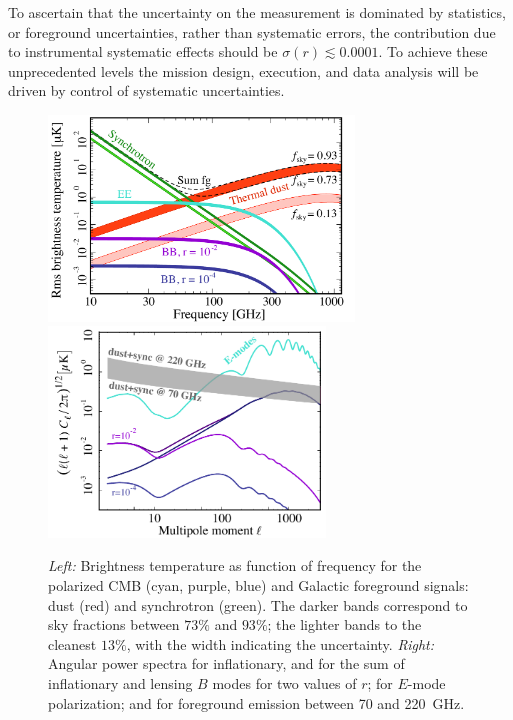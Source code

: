 To ascertain that the uncertainty on the measurement is dominated by statistics, or foreground 
uncertainties, rather than systematic errors, the contribution due to instrumental systematic effects 
should be $\sigma(r)\lesssim0.0001.$ To achieve these unprecedented levels 
the mission design, execution, and data analysis will be driven by control of systematic uncertainties. 
\begin{figure}[ht!]
\vspace{-0.15in}
\hspace{-0.2in}
\begin{center}
\includegraphics[width=3.2in]{Figures/overview_pol_v4_fsky_noplanck.pdf}
\includegraphics[width=2.9in]{Figures/cmb_vs_foreground.pdf}
\end{center}
\vspace{-0.25in}
\caption{\small \setlength{\baselineskip}{0.95\baselineskip}
{\it Left:} Brightness temperature as function of frequency for the polarized CMB (cyan, purple, blue)
and Galactic foreground signals: dust (red) and synchrotron (green). The darker bands correspond to
sky fractions between $73\%$ and $93\%$; the lighter bands to the cleanest $13\%$, with the width 
indicating the uncertainty. {\it Right:} Angular power spectra for inflationary, and for the sum 
of inflationary and lensing $B$ modes for two values of $r$; for $E$-mode polarization; 
and for foreground emission between 70 and 220~GHz.}
\label{fig:frequency}
\vspace{-0.1in}
\end{figure}


